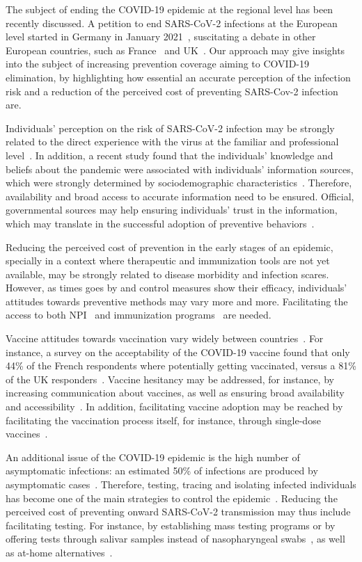 The subject of ending the COVID-19 epidemic at the regional level has been recently discussed. A petition to end SARS-CoV-2 infections at the European level started in Germany in January 2021~\cite[]{ZeroCovid_EU}, suscitating a debate in other European countries, such as France~\cite[]{ZeroCovid_FR} and UK~\cite[]{ZeroCovid_UK}. Our approach may give  insights into the subject of increasing prevention coverage aiming to COVID-19 elimination, by highlighting how essential an accurate perception of the infection risk and a reduction of the perceived cost of preventing SARS-Cov-2 infection are. 

Individuals' perception on the risk of SARS-CoV-2 infection may be strongly related to the direct experience with the virus at the familiar and professional level~\cite[]{Mansilla2020}. In addition, a recent study found that the individuals' knowledge and beliefs about the pandemic were associated with individuals' information sources, which were strongly determined by sociodemographic characteristics~\cite[]{Ali2020}. Therefore, availability and broad access to accurate information need to be ensured. Official, governmental sources may help ensuring  individuals' trust in the information, which may translate in the successful adoption of preventive behaviors~\cite[]{Lim2020}.

Reducing the perceived cost of prevention in the early stages of an epidemic, specially in a context where therapeutic and immunization tools are not yet available, may be strongly related to disease morbidity and infection scares. However, as times goes by and control measures show their efficacy, individuals' attitudes towards preventive methods may vary more and more. Facilitating the access to both NPI~\cite[]{Sugrue2020} and immunization programs~\cite[]{Yamey2020} are needed. 

Vaccine attitudes towards vaccination vary widely between countries~\cite[]{Wuoters2021}. For instance, a survey on the acceptability of the COVID-19 vaccine found that only 44\% of the French respondents where potentially getting vaccinated, versus a 81\% of the UK responders~\cite[]{Wuoters2021}. Vaccine hesitancy may be addressed, for instance, by increasing communication about vaccines, as well as ensuring broad availability and accessibility~\cite[]{Wuoters2021}. In addition, facilitating vaccine adoption may be reached by facilitating the vaccination process itself, for instance, through single-dose vaccines~\cite[]{SanchezFelipe2020}.

An additional issue of the COVID-19 epidemic is the high number of asymptomatic infections: an estimated 50\% of infections are produced by asymptomatic cases~\cite[]{Johansson2021}. Therefore, testing, tracing and isolating infected individuals has become one of the main strategies to control the epidemic~\cite[]{WHO_COVID19Strategy}. Reducing the perceived cost of preventing onward SARS-CoV-2 transmission may thus include facilitating testing. For instance, by establishing mass testing programs or by offering tests through salivar samples instead of nasopharyngeal swabs~\cite[]{Yee2021}, as well as at-home alternatives~\cite[]{ValentineGraves2020}. 

